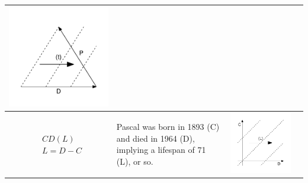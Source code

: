 \documentclass[11pt,oneside,a4paper]{article} %
\begin{document}
\begin{center}
\begin{longtable}{m{}m{}m{}m{}}
  \includegraphics[width = \linewidth]{Figures/JonasTable/PDt_iso.pdf}  \\
  \midrule
  $$\begin{aligned}
    &CD(L) \\
    &L = D - C
  \end{aligned}$$ &
  Pascal was born in 1893 (C) and died in 1964 (D), implying a lifespan of 71
  (L), or so.
  & \includegraphics[width = \linewidth]{Figures/JonasTable/CDl.pdf} &

\end{longtable}
\end{center}
\end{document}
